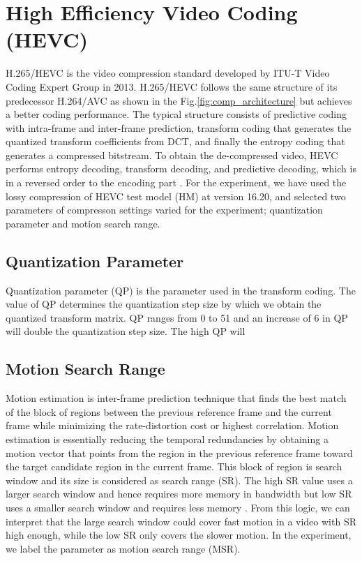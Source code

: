 \section{High Efficiency Video Coding (HEVC)}
\label{sec:background/section_c}

H.265/HEVC is the video compression standard developed by ITU-T Video Coding Expert Group in 2013. H.265/HEVC follows the same structure of its predecessor H.264/AVC as shown in the Fig.\ref{fig:comp_architecture} but achieves a better coding performance. The typical structure consists of predictive coding with intra-frame and inter-frame prediction, transform coding that generates the quantized transform coefficients from DCT, and finally the entropy coding that generates a compressed bitstream. To obtain the de-compressed video, HEVC performs entropy decoding, transform decoding, and predictive decoding, which is in a reversed order to the encoding part \cite{zhang_overview_2019}. For the experiment, we have used the lossy compression of HEVC test model (HM) at version 16.20, and selected two parameters of compresson settings varied for the experiment; quantization parameter and motion search range.

\subsection{Quantization Parameter}
Quantization parameter (QP) is the parameter used in the transform coding. The value of QP determines the quantization step size by which we obtain the quantized transform matrix. QP ranges from 0 to 51 and an increase of 6 in QP will double the quantization step size. The high QP will 

\subsection{Motion Search Range}
Motion estimation is inter-frame prediction technique that finds the best match of the block of regions between the previous reference frame and the current frame while minimizing the rate-distortion cost or highest correlation. Motion estimation is essentially reducing the temporal redundancies by obtaining a motion vector that points from the region in the previous reference frame toward the target candidate region in the current frame. This block of region is search window and its size is considered as search range (SR). The high SR value uses a larger search window and hence requires more memory in bandwidth but low SR uses a smaller search window and requires less memory  \cite{lou_adaptive_2010} \cite{bachu_review_2015}. From this logic, we can interpret that the large search window could cover fast motion in a video with SR high enough, while the low SR only covers the slower motion. In the experiment, we label the parameter as motion search range (MSR).


